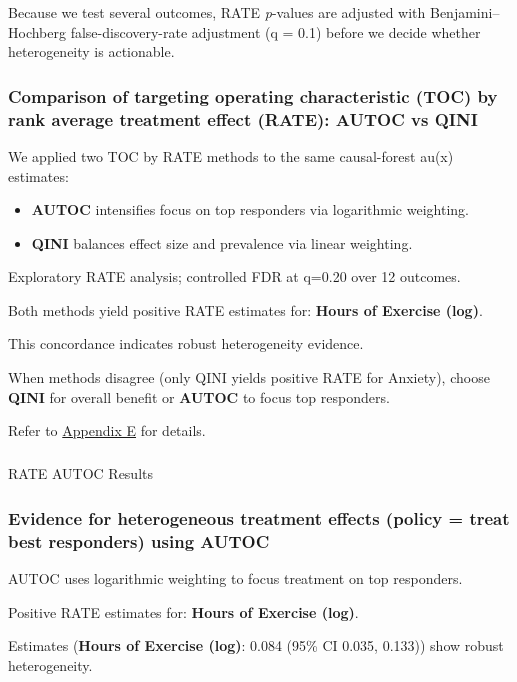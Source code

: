 \documentclass[
  single column]{article}
\makeatletter
\let\oldsubparagraph\subparagraph
\renewcommand{\subparagraph}{
    \@ifstar
      \xxxSubParagraphStar
      \xxxSubParagraphNoStar
  }
\newcommand{\xxxSubParagraphStar}[1]{\oldsubparagraph*{#1}\mbox{}}
\newcommand{\xxxSubParagraphNoStar}[1]{\oldsubparagraph{#1}\mbox{}}
\makeatother
\begin{document}
Because we test several outcomes, RATE \emph{p}-values are adjusted with
Benjamini--Hochberg false-discovery-rate adjustment (q = 0.1) before we
decide whether heterogeneity is actionable.

\subsubsection{Comparison of targeting operating characteristic (TOC) by
rank average treatment effect (RATE): AUTOC vs
QINI}\label{comparison-of-targeting-operating-characteristic-toc-by-rank-average-treatment-effect-rate-autoc-vs-qini}

We applied two TOC by RATE methods to the same causal-forest au(x)
estimates:

\begin{itemize}
\item
  \textbf{AUTOC} intensifies focus on top responders via logarithmic
  weighting.
\item
  \textbf{QINI} balances effect size and prevalence via linear
  weighting.
\end{itemize}

Exploratory RATE analysis; controlled FDR at q=0.20 over 12 outcomes.

Both methods yield positive RATE estimates for: \textbf{Hours of
Exercise (log)}.

This concordance indicates robust heterogeneity evidence.

When methods disagree (only QINI yields positive RATE for Anxiety),
choose \textbf{QINI} for overall benefit or \textbf{AUTOC} to focus top
responders.

Refer to \hyperref[appendix-cate-validation]{Appendix E} for details.

\subparagraph{RATE AUTOC Results}\label{rate-autoc-results}

\subsubsection{Evidence for heterogeneous treatment effects (policy =
treat best responders) using
AUTOC}\label{evidence-for-heterogeneous-treatment-effects-policy-treat-best-responders-using-autoc}

AUTOC uses logarithmic weighting to focus treatment on top responders.

Positive RATE estimates for: \textbf{Hours of Exercise (log)}.

Estimates (\textbf{Hours of Exercise (log)}: 0.084 (95\% CI 0.035,
0.133)) show robust heterogeneity.
\end{document}
